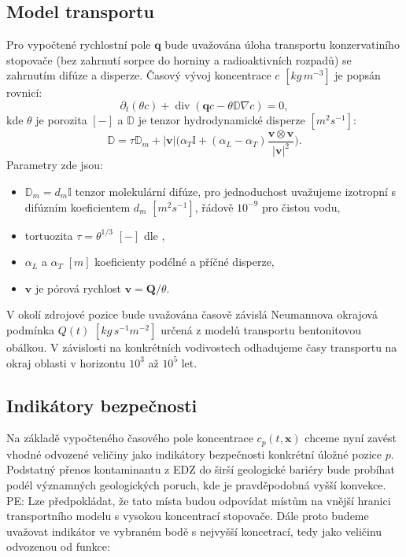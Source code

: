 \documentclass{article}
\def\abs#1{\lvert#1\rvert}
\def\prtl{\partial}
\def\grad{\nabla}
\def\div{\operatorname{div}}
\def\vc#1{\mathbf{\boldsymbol{#1}}}     %
\def\tn#1{{\mathbb{#1}}}    %
\newcommand{\pe}[1]{{\color{orange} PE: #1}}
\begin{document}
\subsection{Model transportu}
\label{sec:stopovac}
Pro vypočtené rychlostní pole $\vc q$ bude uvažována úloha transportu konzervatiního stopovače (bez zahrnutí sorpce do horniny a radioaktivních rozpadů) 
se zahrnutím difúze a disperze. Časový vývoj koncentrace $c$ $[kg\, m^{-3}]$ je popsán rovnicí:
\[
   \prtl_t (\theta c) + \div( \vc q c - \theta \tn D \grad c) = 0,
\]
kde $\theta$ je porozita $[-]$ a $\tn D$ je tenzor hydrodynamické disperze $[m^2s^{-1}]$:
\[
  \tn D = \tau\tn D_m + \abs{\vc v}\Big(\alpha_T \tn I + (\alpha_L - \alpha_T)\frac{\vc v \otimes \vc v}{\abs{\vc v}^2}\Big).
\]
Parametry zde jsou:
\begin{itemize}
 \item $\tn D_m = d_m \tn I$ tenzor molekulární difúze, pro jednoduchost uvažujeme izotropní s difúzním koeficientem $d_m$ $[m^2s^{-1}]$, řádově $10^{-9}$ pro čistou vodu,
 \item tortuozita $\tau=\theta^{1/3}$ $[-]$ dle \cite{millington_quirk},
 \item $\alpha_L$ a $\alpha_T$ $[m]$ koeficienty podélné a příčné disperze,
 \item $\vc v$ je pórová rychlost $\vc v = \vc Q / \theta$.
\end{itemize}

V okolí zdrojové pozice bude uvažována časově závislá Neumannova okrajová podmínka $Q(t)$ $[kg\, s^{-1}m^{-2}]$
určená z modelů transportu bentonitovou obálkou. V závislosti na konkrétních vodivostech odhadujeme časy 
transportu na okraj oblasti v horizontu $10^3$ až $10^5$ let. 



\subsection{Indikátory bezpečnosti}
\label{sec:indikatory}
Na základě vypočteného časového pole koncentrace $c_p(t, \vc x)$ chceme nyní zavést vhodné odvozené veličiny jako indikátory bezpečnosti 
konkrétní úložné pozice $p$. Podstatný přenos kontaminantu z EDZ do širší geologické bariéry bude probíhat podél významných geologických poruch, 
kde je pravděpodobná vyšší konvekce. 
\pe{Lze předpokládat, že tato místa budou odpovídat místům na vnější hranici transportního modelu s vysokou koncentrací stopovače. 
Dále proto budeme uvažovat indikátor ve vybraném bodě s nejvyšší koncetrací, tedy jako veličinu odvozenou od funkce:}
\end{document}
